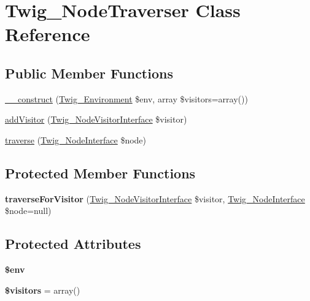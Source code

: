 \hypertarget{classTwig__NodeTraverser}{}\section{Twig\+\_\+\+Node\+Traverser Class Reference}
\label{classTwig__NodeTraverser}
\subsection*{Public Member Functions}
\begin{DoxyCompactItemize}
\item 
\hyperlink{classTwig__NodeTraverser_ab67171e04d51d9bdbbb24278dae5d246}{\+\_\+\+\_\+construct} (\hyperlink{classTwig__Environment}{Twig\+\_\+\+Environment} \$env, array \$visitors=array())
\item 
\hyperlink{classTwig__NodeTraverser_ac385365cc9b16d1fad618d6a53c01345}{add\+Visitor} (\hyperlink{interfaceTwig__NodeVisitorInterface}{Twig\+\_\+\+Node\+Visitor\+Interface} \$visitor)
\item 
\hyperlink{classTwig__NodeTraverser_a82f1255d4b6e9d965577febf8f54239c}{traverse} (\hyperlink{interfaceTwig__NodeInterface}{Twig\+\_\+\+Node\+Interface} \$node)
\end{DoxyCompactItemize}
\subsection*{Protected Member Functions}
\begin{DoxyCompactItemize}
\item 
{\bfseries traverse\+For\+Visitor} (\hyperlink{interfaceTwig__NodeVisitorInterface}{Twig\+\_\+\+Node\+Visitor\+Interface} \$visitor, \hyperlink{interfaceTwig__NodeInterface}{Twig\+\_\+\+Node\+Interface} \$node=null)\hypertarget{classTwig__NodeTraverser_a14800bf9bcf47ba43858b463d8931add}{}\label{classTwig__NodeTraverser_a14800bf9bcf47ba43858b463d8931add}

\end{DoxyCompactItemize}
\subsection*{Protected Attributes}
\begin{DoxyCompactItemize}
\item 
{\bfseries \$env}\hypertarget{classTwig__NodeTraverser_a435c7c6c984bba36bcb52bf82c081485}{}\label{classTwig__NodeTraverser_a435c7c6c984bba36bcb52bf82c081485}

\item 
{\bfseries \$visitors} = array()\hypertarget{classTwig__NodeTraverser_a323be8e514157eee9bdf8c519a35fe88}{}\label{classTwig__NodeTraverser_a323be8e514157eee9bdf8c519a35fe88}

\end{DoxyCompactItemize}


